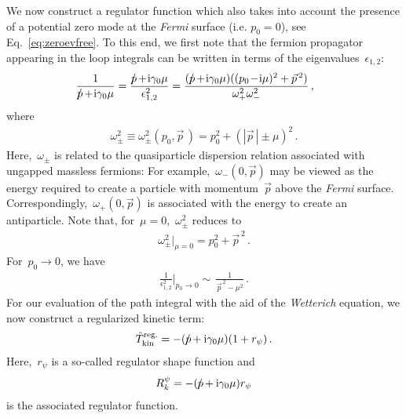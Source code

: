 \documentclass[prd,english,preprintnumbers,amsmath,amssymb,nofootinbib,twocolumn,superscriptaddress]{revtex4-1}
\newcommand{\I}{\mathrm{i}}
\newcommand{\be}{\begin{eqnarray}}
\newcommand{\ee}{\end{eqnarray}}
\newcommand{\fslash}{\hspace*{-0.2cm}\slash }
\begin{document}
{{We now construct a regulator function which also takes into account the presence of a potential zero mode 
at the {\it Fermi} surface (i.e. $p_0=0$), see Eq.~\eqref{eq:zeroevfree}.
To this end, we first note that  
the fermion propagator appearing in the loop integrals can be written in terms of the {eigenvalues~$\epsilon_{1,2}$:
%
\be
\!\!\!\!\!\!\!\!\!\!\frac{1}{p\fslash +\! {\rm i}\gamma_0\mu} =  \frac{p\fslash +\! {\rm i}\gamma_0\mu}{ \epsilon_{1,2}^2}
= \frac{(p\fslash +\! {\rm i}\gamma_0\mu)((p_0\! -\!\I\mu)^2 +\vec{p}^{\,2})}{\omega_{+}^2\omega_{-}^2}\,,
\ee
%
where}
%
\be
\omega_{\pm}^2\equiv \omega_{\pm}^2(p_0,\vec{p}^{\,})  = p_0^2 + ( |\vec{p}^{\,}| \pm \mu )^2\,.
\ee
%
Here,~$\omega_{\pm}$ is related to the quasiparticle dispersion relation associated with ungapped massless fermions:
For example,~$\omega_{-}(0,\vec{p})$ may be viewed as the energy required to create a particle 
with momentum~$\vec{p}$ above the {\it Fermi} 
surface. Correspondingly,~$\omega_{+}(0,\vec{p})$
is associated with the energy to create an antiparticle. Note that, for~$\mu=0$,~$\omega_{\pm}^2$ reduces to 
%
\be
\omega_{\pm}^2\big|_{\mu=0} = p_0^2 +\vec{p}^{\,2}\,.
\ee
%
For~$p_0\to 0$, we have
%
\be
\frac{1}{\epsilon_{1,2}^2} \bigg|_{p_0\to 0} \sim\, \frac{1}{\vec{p}^{\,2}-\mu^2}\,.
\ee
%
For our evaluation of the path integral with the aid of the {\it Wetterich} equation, 
we now construct a regularized kinetic {term:
%
\be
\hat{T}_{\rm kin} ^{\text{reg.}}= -( p\fslash + {\rm i}\gamma_0\mu)(1+r_{\psi})\,.
\ee
%
Here,~$r_{\psi}$ is} a so-called regulator shape function {and
%
\be
R^{\psi}_k= - (p\fslash + {\rm i}\gamma_0\mu) r_{\psi}\label{eq:Rcv1}
\ee
%
is} the associated regulator function. 

}}
\end{document}
